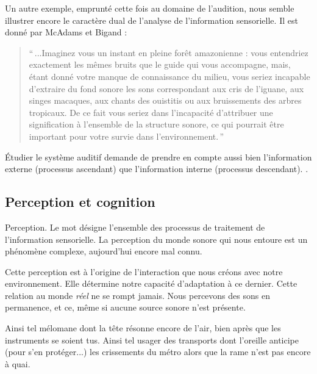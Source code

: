 Un autre exemple, emprunté cette fois au domaine de l'audition, nous semble illustrer encore le caractère dual de l'analyse de l'information sensorielle. Il est donné par McAdams et Bigand \citep[p. 2]{mcadams1994penser}:

\begin{quote}
``\,...Imaginez vous un instant en pleine forêt amazonienne : vous entendriez exactement les mêmes bruits que le guide qui vous accompagne, mais, étant donné votre manque de connaissance du milieu, vous seriez incapable d'extraire du fond sonore les sons correspondant aux cris de l'iguane, aux singes macaques, aux chants des ouistitis ou aux bruissements des arbres tropicaux. De ce fait vous seriez dans l'incapacité d'attribuer une signification à l'ensemble de la structure sonore, ce qui pourrait être important pour votre survie dans l'environnement.\,''
\end{quote}

Étudier le système auditif demande de prendre en compte aussi bien l'information externe (processus ascendant) que l'information interne (processus descendant). . \\


\subsection{Perception et cognition}
\label{sec:ch3_perceptionCognition}

Perception. Le mot désigne l'ensemble des processus de traitement de l'information sensorielle. La perception du monde sonore qui nous entoure est un phénomène complexe, aujourd'hui encore mal connu. 

Cette perception est à l'origine de l'interaction que nous créons avec notre environnement. Elle détermine notre capacité d'adaptation à ce dernier. Cette relation au monde \emph{réel} ne se rompt jamais. Nous percevons des sons en permanence, et ce, même si aucune source sonore n'est présente. 

Ainsi tel mélomane dont la tête résonne encore de l'air, bien après que les instruments se soient tus. Ainsi tel usager des transports dont l'oreille anticipe (pour s'en protéger...) les crissements du métro alors que la rame n'est pas encore à quai.

